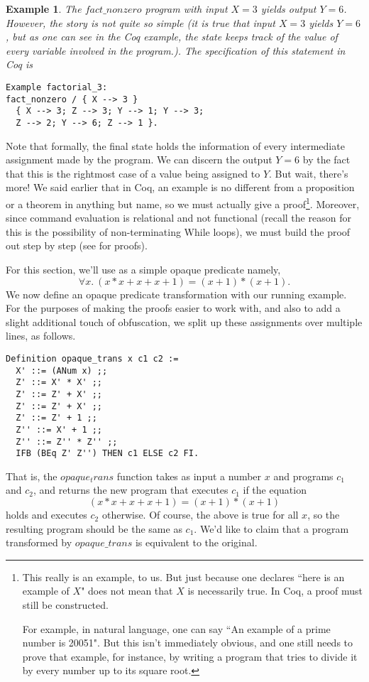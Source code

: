 \documentclass[compsoc,conference,a4paper,10pt,times]{IEEEtran}
\newtheorem{example}[theorem]{Example}
\begin{document}
\begin{example}\label{firstoff}
    The $fact\_nonzero$ program with input $X=3$ yields output $Y=6$.  However, the story is not quite so simple (it is true that input $X=3$ yields $Y=6$, but as one can see in the Coq example, the state keeps track of the value of every variable involved in the program.).  The specification of this statement in Coq is
\begin{verbatim}
Example factorial_3: 
fact_nonzero / { X --> 3 } 
  { X --> 3; Z --> 3; Y --> 1; Y --> 3; 
  Z --> 2; Y --> 6; Z --> 1 }.
\end{verbatim}
\end{example}
    Note that formally, the final state holds the information of every intermediate assignment made by the program.  We can discern the output $Y=6$ by the fact that this is the rightmost case of a value being assigned to $Y$.  But wait, there's more!  We said earlier that in Coq, an example is no different from a proposition or a theorem in anything but name, so we must actually give a proof\footnote{This really is an example, to us.  But just because one declares ``here is an example of $X$" does not mean that $X$ is necessarily true.  In Coq, a proof must still be constructed.\par For example, in natural language, one can say ``An example of a prime number is 20051".  But this isn't immediately obvious, and one still needs to prove that example, for instance, by writing a program that tries to divide it by every number up to its square root.}.  Moreover, since command evaluation is relational and not functional (recall the reason for this is the possibility of non-terminating While loops), we must build the proof out step by step (see \cite{WeiRepo} for proofs).

For this section, we'll use as a simple opaque predicate namely,
    \[
    	\forall x.\ (x * x + x + x + 1) = (x + 1) * (x + 1).
    \]
We now define an opaque predicate transformation with our running example.  
    For the purposes of making the proofs easier to work with, and also to add a slight additional touch of obfuscation, we split up these assignments over multiple lines, as follows.
\begin{verbatim}
Definition opaque_trans x c1 c2 :=
  X' ::= (ANum x) ;;
  Z' ::= X' * X' ;;
  Z' ::= Z' + X' ;;
  Z' ::= Z' + X' ;;
  Z' ::= Z' + 1 ;;
  Z'' ::= X' + 1 ;;
  Z'' ::= Z'' * Z'' ;;
  IFB (BEq Z' Z'') THEN c1 ELSE c2 FI.
\end{verbatim}
That is, the $opaque_trans$ function takes as input a number $x$ and programs $c_1$ and $c_2$, and returns the new program that executes $c_1$ if the equation
\[
	(x * x + x + x + 1) = (x + 1) * (x + 1)
\]
holds and executes $c_2$ otherwise.  Of course, the above is true for all $x$, so the resulting program should be the same as $c_1$.  We'd like to claim that a program transformed by $opaque\_trans$ is equivalent to the original.
\end{document}
